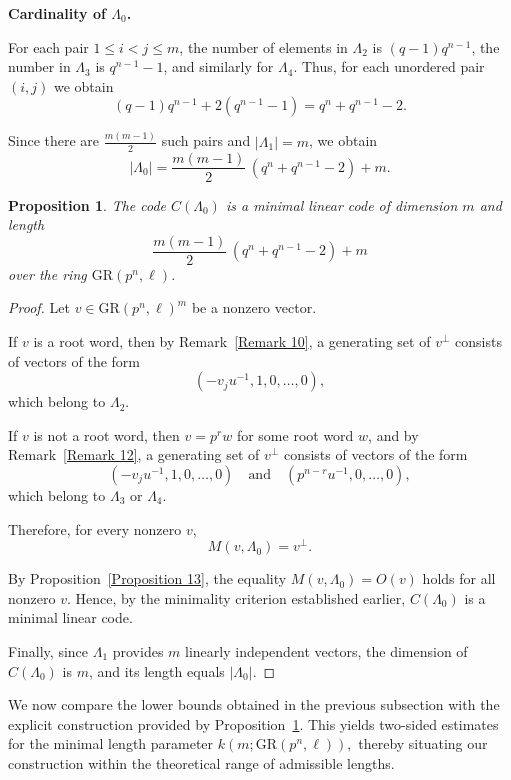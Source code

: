 \documentclass[10pt]{article}
\newtheorem{prop}[lem]{Proposition}
\theoremstyle{definition}
\begin{document}
\medskip

\noindent
\textbf{Cardinality of $\Lambda_0$.}

For each pair $1\le i<j\le m$, the number of elements in
\(
\Lambda_2
\)
is $(q-1)q^{n-1}$,
the number in
\(
\Lambda_3
\)
is $q^{n-1}-1$,
and similarly for
\(
\Lambda_4
\).
Thus, for each unordered pair $(i,j)$ we obtain
\[
(q-1)q^{n-1} + 2(q^{n-1}-1)
=
q^{n}+q^{n-1}-2.
\]

Since there are $\frac{m(m-1)}{2}$ such pairs and $|\Lambda_1|=m$, we obtain
\[
|\Lambda_0|
=
\frac{m(m-1)}{2}\,(q^{n}+q^{n-1}-2)
+
m.
\]




\begin{prop}\label{Proposition 2}
The code \( C(\Lambda_0) \) is a minimal linear code of dimension \( m \) and length
\[
\frac{m(m-1)}{2}\,(q^{n}+q^{n-1}-2)+m
\]
over the ring \( \mathrm{GR}(p^{n},\ell) \).
\end{prop}


\begin{proof}
Let $v \in \mathrm{GR}(p^{n},\ell)^{m}$ be a nonzero vector.

If $v$ is a root word, then by Remark~\ref{Remark 10}, a generating set of $v^{\perp}$ consists of vectors of the form
\[
(-v_ju^{-1},1,0,\dots,0),
\]
which belong to $\Lambda_2$.

If $v$ is not a root word, then $v=p^{r}w$ for some root word $w$, and by Remark~\ref{Remark 12}, a generating set of $v^{\perp}$ consists of vectors of the form
\[
(-v_ju^{-1},1,0,\dots,0)
\quad \text{and} \quad
(p^{n-r}u^{-1},0,\dots,0),
\]
which belong to $\Lambda_3$ or $\Lambda_4$.

Therefore, for every nonzero $v$,
\[
M(v,\Lambda_0)=v^{\perp}.
\]

By Proposition~\ref{Proposition 13}, the equality
\(
M(v,\Lambda_0)=O(v)
\)
holds for all nonzero $v$.
Hence, by the minimality criterion established earlier,
\( C(\Lambda_0) \) is a minimal linear code.

Finally, since $\Lambda_1$ provides $m$ linearly independent vectors,
the dimension of $C(\Lambda_0)$ is $m$, and its length equals $|\Lambda_0|$.
\end{proof}



We now compare the lower bounds obtained in the previous subsection with the explicit construction provided by Proposition~\ref{Proposition 2}.
This yields two-sided estimates for the minimal length parameter $k(m;\mathrm{GR}(p^{n},\ell)),$
thereby situating our construction within the theoretical range of admissible lengths.
\end{document}
